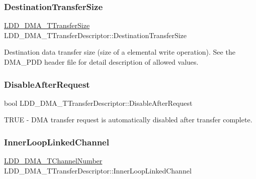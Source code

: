 \subsubsection{\texorpdfstring{Destination\+Transfer\+Size}{DestinationTransferSize}}
{\footnotesize\ttfamily \hyperlink{group___p_e___types__module_ga868f08f9448e5df27a38314f0893d84a}{L\+D\+D\+\_\+\+D\+M\+A\+\_\+\+T\+Transfer\+Size} L\+D\+D\+\_\+\+D\+M\+A\+\_\+\+T\+Transfer\+Descriptor\+::\+Destination\+Transfer\+Size}

Destination data transfer size (size of a elemental write operation). See the D\+M\+A\+\_\+\+P\+DD header file for detail description of allowed values. \mbox{\label{struct_l_d_d___d_m_a___t_transfer_descriptor_af47462df9934c927bd3cb1c8c7a4aa94}} 
\subsubsection{\texorpdfstring{Disable\+After\+Request}{DisableAfterRequest}}
{\footnotesize\ttfamily bool L\+D\+D\+\_\+\+D\+M\+A\+\_\+\+T\+Transfer\+Descriptor\+::\+Disable\+After\+Request}

T\+R\+UE -\/ D\+MA transfer request is automatically disabled after transfer complete. \mbox{\label{struct_l_d_d___d_m_a___t_transfer_descriptor_a78eb4ce6c6e05add15799c5389637ce3}} 
\subsubsection{\texorpdfstring{Inner\+Loop\+Linked\+Channel}{InnerLoopLinkedChannel}}
{\footnotesize\ttfamily \hyperlink{group___p_e___types__module_gad268d607015891269cb015faa8bc0dac}{L\+D\+D\+\_\+\+D\+M\+A\+\_\+\+T\+Channel\+Number} L\+D\+D\+\_\+\+D\+M\+A\+\_\+\+T\+Transfer\+Descriptor\+::\+Inner\+Loop\+Linked\+Channel}

